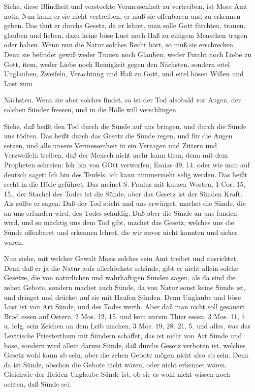 Siehe, diese Blindheit und verstockte Vermessenheit zu vertreiben, ist Mose Amt noth. Nun kann er sie nicht vertreiben, er muß sie offenbaren und zu erkennen geben. Das thut er durchs Gesetz, da er lehret, man solle Gott fürchten, trauen, glauben und lieben, dazu keine böse Lust noch Haß zu einigem Menschen tragen oder haben. Wenn nun die Natur solches Recht hört, so muß sie erschrecken. Denn sie befindet gewiß weder Trauen noch Glauben, weder Furcht noch Liebe zu Gott, item, weder Liebe noch Reinigkeit gegen den Nächsten, sondern eitel Unglauben, Zweifeln, Verachtung und Haß zu Gott, und eitel bösen Willen und Lust zum


Nächsten. Wenn sie aber solches findet, so ist der Tod alsobald vor Augen, der solchen Sünder fressen, und in die Hölle will verschlingen.

Siehe, daß heißt den Tod durch die Sünde auf uns bringen, und durch die Sünde uns tödten. Das heißt durch das Gesetz die Sünde regen, und für die Augen setzen, und alle unsere Vermessenheit in ein Verzagen und Zittern und Verzweifeln treiben, daß der Mensch nicht mehr kann thun, denn mit dem Propheten schreien: Ich bin von GOtt verworfen, Esaias 49, 14. oder wie man auf deutsch saget: Ich bin des Teufels, ich kann nimmermehr selig werden. Das heißt recht in die Hölle geführet. Das meinet S. Paulus mit kurzen Worten, 1 Cor. 15, 15., der Stachel des Todes ist die Sünde, aber das Gesetz ist der Sünden Kraft. Als sollte er sagen: Daß der Tod sticht und uns erwürget, machet die Sünde, die an uns erfunden wird, des Todes schuldig. Daß aber die Sünde an uns funden wird, und so mächtig uns dem Tod gibt, machet das Gesetz, welches uns die Sünde offenbaret und erkennen lehret, die wir zuvor nicht kannten und sicher waren.

Nun siehe, mit welcher Gewalt Mosis solches sein Amt treibet und ausrichtet. Denn daß er ja die Natur aufs allerhöchste schände, gibt er nicht allein solche Gesetze, die von natürlichen und wahrhaftigen Sünden sagen, als da sind die zehen Gebote, sondern machet auch Sünde, da von Natur sonst keine Sünde ist, und dringet und drücket auf sie mit Haufen Sünden. Denn Unglaube und böse Lust ist von Art Sünde, und des Todes werth. Aber daß man nicht soll gesäuert Brod essen auf Ostern, 2 Mos. 12, 15. und kein unrein Thier essen, 3 Mos. 11, 4. u. folg. sein Zeichen an dem Leib machen, 3 Mos. 19, 28. 21, 5. und alles, was das Levitische Priesterthum mit Sündern schaffet, das ist nicht von Art Sünde und böse, sondern wird allein darum Sünde, daß durchs Gesetz verboten ist, welches Gesetz wohl kann ab sein, aber die zehen Gebote mögen nicht also ab sein. Denn da ist Sünde, obschon die Gebote nicht wären, oder nicht erkennet wären. Gleichwie der Heiden Unglaube Sünde ist, ob sie es wohl nicht wissen noch achten, daß Sünde sei.

